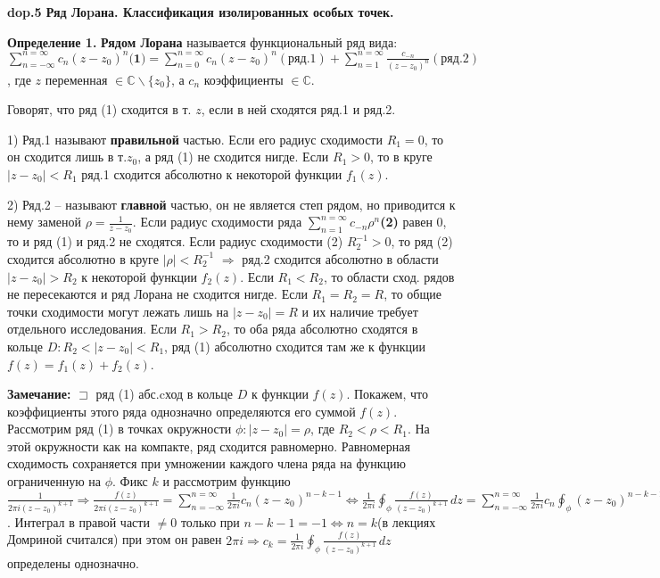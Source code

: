 \setcounter{section}{4}
\setcounter{subsection}{5}
\setcounter{equation}{0}
\textbf{\LARGE dop.5 Ряд Лоpана. Классификация изолиpованных особых точек.}

\textbf{Определение 1.}
\textbf{Рядом Лорана} называется функциональный ряд вида: $\sum_{n=-\infty}^{n=\infty}c_n(z-z_0)^n\textbf{(1)} = \sum_{n=0}^{n=\infty}c_n(z-z_0)^n(\text{ряд.1}) +  \sum_{n=1}^{n=\infty}\frac{c_{-n}}{(z-z_0)^n}(\text{ряд.2})$, где $z$ переменная $\in \mathbb{C}\backslash\{z_0\}$, а $c_n$ коэффициенты $\in \mathbb{C}$.

\noindent Говорят, что ряд (1) сходится в т. $z$, если в ней сходятся ряд.1 и ряд.2.

    1) Ряд.1 называют \textbf{правильной} частью. Если его радиус сходимости $R_1=0$, то он сходится лишь в т.$z_0$, а ряд (1) не сходится нигде. Если $R_1>0$, то в круге $|z-z_0|<R_1$ ряд.1 сходится абсолютно к некоторой функции $f_1(z)$.
    
    2) Ряд.2 -- называют \textbf{главной} частью, он не является степ рядом, но приводится к нему заменой $\rho = \frac{1}{z-z_0}$. Если радиус сходимости ряда $\sum_{n=1}^{n=\infty}c_{-n}\rho^n$\textbf{(2)} равен 0, то и ряд (1) и ряд.2 не сходятся. Если радиус сходимости (2) $R^{-1}_2 > 0$, то ряд (2) сходится абсолютно в круге $|\rho|<R^{-1}_2$ $\Rightarrow$ ряд.2 сходится абсолютно в области $|z-z_0|>R_2$  к некоторой функции $f_2(z)$. Если $R_1<R_2$, то области сход. рядов не пересекаются и ряд Лорана не сходится нигде. Если $R_1=R_2=R$, то общие точки сходимости могут лежать лишь на $|z-z_0|=R$ и их наличие требует отдельного исследования. Если $R_1>R_2$, то оба ряда абсолютно сходятся в кольце $D: R_2<|z-z_0|<R_1$, ряд (1) абсолютно сходится там же к функции $f(z) = f_1(z)+f_2(z)$.
    
\textbf{Замечание:} $\sqsupset$ ряд (1) абс.cход в кольце $D$ к функции $f(z)$. Покажем, что коэффициенты этого ряда однозначно определяются его суммой $f(z)$. Рассмотрим ряд (1) в точках окружности $\phi: |z-z_0|=\rho$, где $R_2<\rho<R_1$. На этой окружности как на компакте, ряд сходится равномерно. Равномерная сходимость сохраняется при умножении каждого члена ряда на функцию ограниченную на $\phi$. Фикс $k$ и рассмотрим функцию $\frac{1}{2\pi i(z-z_0)^{k+1}} \Rightarrow \frac{f(z)}{2\pi i(z-z_0)^{k+1}} = \sum_{n=-\infty}^{n=\infty}\frac{1}{2\pi i}c_n(z-z_0)^{n-k-1} \Longleftrightarrow \frac{1}{2\pi i} \oint_\phi \frac{f(z)}{(z-z_0)^{k+1}} \,dz = \sum_{n=-\infty}^{n=\infty}\frac{1}{2\pi i}c_n\oint_\phi(z-z_0)^{n-k-1} \,dz$. Интеграл в правой части $\neq0$ только при $n-k-1=-1 \Longleftrightarrow n=k$(в лекциях Домриной считался) при этом он равен $2\pi i \Rightarrow c_k = \frac{1}{2\pi i} \oint_\phi \frac{f(z)}{(z-z_0)^{k+1}} \,dz$ определены однозначно.

